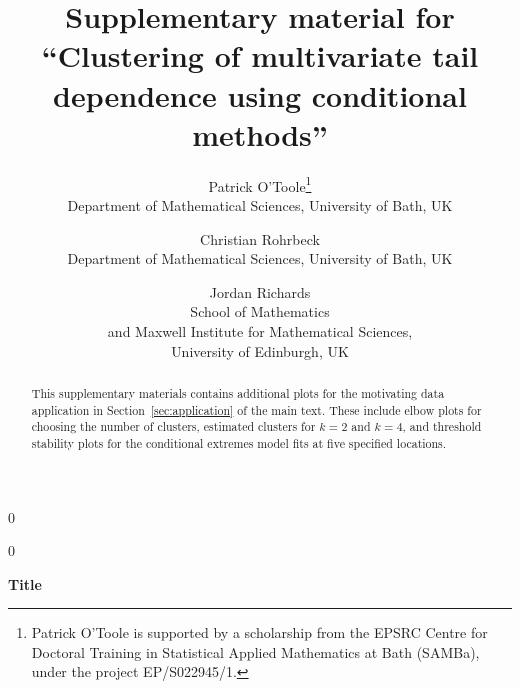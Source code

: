 \documentclass[12pt,compact]{article}
\newcommand{\blind}{0}
\begin{document}
\def\spacingset#1{\renewcommand{\baselinestretch}%
{#1}\small\normalsize} \spacingset{1}


\blind
{
  \title{\bf Supplementary material for ``Clustering of multivariate tail dependence using conditional methods''}
  \author{
  Patrick O'Toole\thanks{Patrick O'Toole is supported by a scholarship from the EPSRC Centre for Doctoral Training in Statistical Applied Mathematics at Bath (SAMBa), under the project EP/S022945/1.}\\
  Department of Mathematical Sciences, University of Bath, UK
  \and
  Christian Rohrbeck\\
  Department of Mathematical Sciences, University of Bath, UK 
  \and
  Jordan Richards\\
  School of Mathematics \\
  and Maxwell Institute for Mathematical Sciences, \\
  University of Edinburgh, UK
  }
  \maketitle
} \fi

\blind
{
  \bigskip
  \begin{center}
    {\LARGE\bf Title}
\end{center}
  \medskip
} \fi

\begin{abstract}
  This supplementary materials contains additional plots for the motivating data application in Section~\ref{sec:application} of the main text.
  These include elbow plots for choosing the number of clusters, estimated clusters for $k=2$ and $k=4$, and threshold stability plots for the conditional extremes model fits at five specified locations.
\end{abstract}

\newpage
\spacingset{1.75} %

\setlength{\textfloatsep}{10pt plus 1pt minus 2pt}
\setlength{\intextsep}{8pt plus 1pt minus 2pt}
\setlength{\floatsep}{8pt plus 1pt minus 2pt}

\setlength{\abovedisplayskip}{8pt plus 2pt minus 4pt}
\setlength{\belowdisplayskip}{8pt plus 2pt minus 4pt}
\setlength{\abovedisplayshortskip}{4pt plus 2pt minus 4pt}
\setlength{\belowdisplayshortskip}{4pt plus 2pt minus 4pt}
\end{document}
